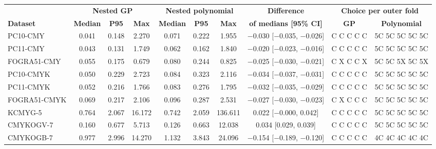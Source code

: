 \begin{tabular}{@{}lccccccccc@{}}
\toprule
 & \multicolumn{3}{c}{\textbf{Nested GP}} & \multicolumn{3}{c}{\textbf{Nested polynomial}} & \textbf{Difference} & \multicolumn{2}{c}{\textbf{Choice per outer fold}} \\
\cmidrule(lr){2-4}\cmidrule(lr){5-7}\cmidrule(lr){9-10}
\textbf{Dataset} & \textbf{Median} & \textbf{P95} & \textbf{Max} & \textbf{Median} & \textbf{P95} & \textbf{Max} & \textbf{of medians [95\% CI]} & \textbf{GP} & \textbf{Polynomial} \\
\midrule
PC10-CMY & 0.041 & 0.148 & 2.270 & 0.071 & 0.222 & 1.955 & $-$0.030 [$-$0.035, $-$0.026] & C C C C C & 5C 5C 5C 5C 5C \\
PC11-CMY & 0.043 & 0.131 & 1.749 & 0.062 & 0.162 & 1.840 & $-$0.020 [$-$0.023, $-$0.016] & C C C C C & 5C 5C 5C 5C 5C \\
FOGRA51-CMY & 0.055 & 0.175 & 0.679 & 0.080 & 0.244 & 0.825 & $-$0.025 [$-$0.030, $-$0.021] & C X C C X & 5C 5C 5X 5C 5X \\
PC10-CMYK & 0.050 & 0.229 & 2.723 & 0.084 & 0.323 & 2.116 & $-$0.034 [$-$0.037, $-$0.031] & C C C C C & 5C 5C 5C 5C 5C \\
PC11-CMYK & 0.052 & 0.216 & 1.766 & 0.083 & 0.276 & 1.795 & $-$0.032 [$-$0.035, $-$0.029] & C C C C C & 5C 5C 5C 5C 5C \\
FOGRA51-CMYK & 0.069 & 0.217 & 2.106 & 0.096 & 0.287 & 2.531 & $-$0.027 [$-$0.030, $-$0.023] & C X C C C & 5C 5C 5C 5C 5C \\
KCMYG-5 & 0.764 & 2.067 & 16.172 & 0.742 & 2.059 & 136.611 & 0.022 [$-$0.000, 0.042] & C C C C C & 5C 5C 5C 5C 5C \\
CMYKOGV-7 & 0.160 & 0.677 & 5.713 & 0.126 & 0.663 & 12.038 & 0.034 [0.029, 0.039] & C C C C C & 5C 5C 5C 5C 5C \\
CMYKOGB-7 & 0.977 & 2.996 & 14.270 & 1.132 & 3.843 & 24.096 & $-$0.154 [$-$0.189, $-$0.120] & C C C C C & 4C 4C 4C 4C 4C \\
\bottomrule
\end{tabular}
